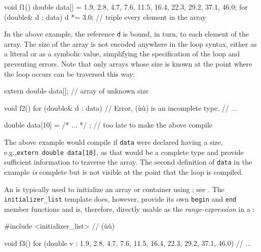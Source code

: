 {{\begin{emcppslisting}
void f1()
{
    double data[] = {1.9, 2.8, 4.7, 7.6, 11.5, 16.4, 22.3, 29.2, 37.1, 46.0};
    for (double& d : data)
    {
        d *= 3.0;  // triple every element in the array
    }
}
\end{emcppslisting}


\noindent In the above example, the reference \lstinline!d! is bound, in turn, to
each element of the array. The size of the array is not encoded anywhere
in the loop syntax, either as a literal or as a symbolic value,
simplifying the specification of the loop and preventing errors. Note
that only arrays whose size is known at the point where the loop occurs
can be traversed this way:

\begin{emcppslisting}
extern double data[];  // array of unknown size

void f2()
{
    for (double& d : data)  // Error, (ù{}ù) is an incomplete type.
    {
        // ...
    }
}

double data[10] = { /* ... */ };  // too late to make the above compile
\end{emcppslisting}


\noindent The above example would compile if \lstinline!data! were declared having a
size, e.g.,\linebreak[4] \lstinline!extern!~\lstinline!double!~\lstinline!data[10]!, as that
would be a complete type and provide sufficient information to traverse
the array. The second definition of \lstinline!data! in the example
\emph{is} complete but is not visible at the point that the loop is
compiled.

An  is typically used to initialize an array or
container using ; see . The \lstinline!initializer_list! template does,
however, provide its own \lstinline!begin! and \lstinline!end! member
functions and is, therefore, directly usable as the
\emph{range-expression} in a :

\begin{emcppslisting}
#include <initializer_list>  // (ù{}ù)

void f3()
{
    for (double v : {1.9, 2.8, 4.7, 7.6, 11.5, 16.4, 22.3, 29.2, 37.1, 46.0})
    {
        // ...
    }
}
\end{emcppslisting}


}}
